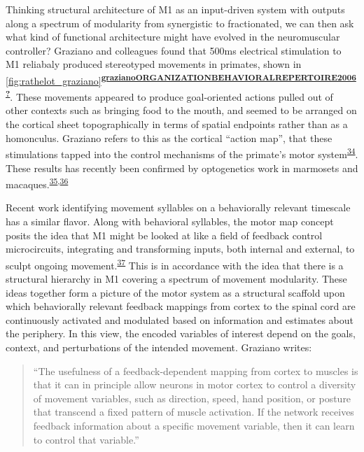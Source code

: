 \documentclass[
  a4paper,
]{article}
\begin{document}
Thinking structural architecture of M1 as an input-driven system with
outputs along a spectrum of modularity from synergistic to fractionated,
we can then ask what kind of functional architecture might have evolved
in the neuromuscular controller? Graziano and colleagues found that
500ms electrical stimulation to M1 reliabaly produced stereotyped
movements in primates, shown in
\cref{fig:rathelot_graziano}\textsuperscript{\protect\hyperlink{ref-grazianoORGANIZATIONBEHAVIORALREPERTOIRE2006}{\textbf{grazianoORGANIZATIONBEHAVIORALREPERTOIRE2006?}}}.
These movements appeared to produce goal-oriented actions pulled out of
other contexts such as bringing food to the mouth, and seemed to be
arranged on the cortical sheet topographically in terms of spatial
endpoints rather than as a homonculus. Graziano refers to this as the
cortical ``action map'', that these stimulations tapped into the control
mechanisms of the primate's motor
system\textsuperscript{\protect\hyperlink{ref-grazianoIntelligentMovementMachine2009}{34}}.
These results has recently been confirmed by optogenetics work in
marmosets and
macaques.\textsuperscript{\protect\hyperlink{ref-ebina2019}{35},\protect\hyperlink{ref-watanabeForelimbMovementsEvoked2020}{36}}

Recent work identifying movement syllables on a behaviorally relevant
timescale has a similar flavor. Along with behavioral syllables, the
motor map concept posits the idea that M1 might be looked at like a
field of feedback control microcircuits, integrating and transforming
inputs, both internal and external, to sculpt ongoing
movement.\textsuperscript{\protect\hyperlink{ref-wiltschkoMappingSubSecondStructure2015}{37}}
This is in accordance with the idea that there is a structural hierarchy
in M1 covering a spectrum of movement modularity. These ideas together
form a picture of the motor system as a structural scaffold upon which
behaviorally relevant feedback mappings from cortex to the spinal cord
are continuously activated and modulated based on information and
estimates about the periphery. In this view, the encoded variables of
interest depend on the goals, context, and perturbations of the intended
movement. Graziano writes:

\begin{quote}
``The usefulness of a feedback-dependent mapping from cortex to muscles
is that it can in principle allow neurons in motor cortex to control a
diversity of movement variables, such as direction, speed, hand
position, or posture that transcend a fixed pattern of muscle
activation. If the network receives feedback information about a
specific movement variable, then it can learn to control that
variable.''
\end{quote}
\end{document}
